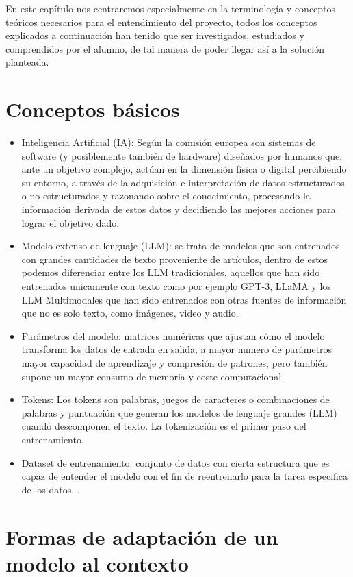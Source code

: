 En este capítulo nos centraremos especialmente en la terminología y conceptos teóricos necesarios para el entendimiento del proyecto, todos los conceptos explicados a continuación han tenido que ser investigados, estudiados y comprendidos por el alumno, de tal manera de poder llegar así a la solución planteada.
\section{Conceptos básicos}
\begin{itemize}
    \item Inteligencia Artificial (IA): Según la comisión europea son sistemas de software (y posiblemente también de hardware) diseñados por humanos que, ante un objetivo complejo, actúan en la dimensión física o digital percibiendo su entorno, a través de la adquisición e interpretación de datos estructurados o no estructurados y razonando sobre el conocimiento, procesando la información derivada de estos datos y decidiendo las mejores acciones para lograr el objetivo dado. \cite{definicionIA}
    \item Modelo extenso de lenguaje (LLM): se trata de modelos que son entrenados con grandes cantidades de texto proveniente de artículos, dentro de estos podemos diferenciar entre los LLM tradicionales, aquellos que han sido entrenados unicamente con texto como por ejemplo GPT-3, LLaMA y los LLM Multimodales que han sido entrenados con otras fuentes de información que no es solo texto, como imágenes, video y audio.
    \item Parámetros del modelo: matrices numéricas que ajustan cómo el modelo  transforma los datos de entrada en salida, a mayor numero de parámetros mayor capacidad de aprendizaje y compresión de patrones, pero también supone un mayor consumo de memoria y coste computacional
    \item Tokens: Los tokens son palabras, juegos de caracteres o combinaciones de palabras y puntuación que generan los modelos de lenguaje grandes (LLM) cuando descomponen el texto. La tokenización es el primer paso del entrenamiento.
    \item Dataset de entrenamiento: conjunto de datos con cierta estructura que es capaz de entender el modelo con el fin de reentrenarlo para la tarea especifica de los datos.
.
\end{itemize}

\section{Formas de adaptación de un modelo al contexto}

